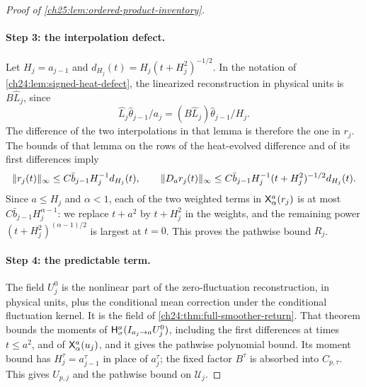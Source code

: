 \begin{proof}[Proof of \cref{ch25:lem:ordered-product-inventory}]
\paragraph{Step 3: the interpolation defect.}
Let $H_j=a_{j-1}$ and $d_{H_j}(t)=H_j(t+H_j^2)^{-1/2}$. In the notation of \cref{ch24:lem:signed-heat-defect}, the linearized reconstruction in physical units is $B\widehat L_j$, since
\[
 \widehat L_j\widehat\theta_{j-1}/a_j=(B\widehat L_j)\widehat\theta_{j-1}/H_j.
\]
The difference of the two interpolations in that lemma is therefore the one in $r_j$. The bounds of that lemma on the rows of the heat-evolved difference and of its first differences imply
\[
 \lVert r_j(t)\rVert_\infty\le C\bar b_{j-1}H_j^{-1}d_{H_j}(t),\qquad
 \lVert D_ar_j(t)\rVert_\infty\le C\bar b_{j-1}H_j^{-1}(t+H_j^2)^{-1/2}d_{H_j}(t).
\]
Since $a\le H_j$ and $\alpha<1$, each of the two weighted terms in $\mathsf X_{\alpha}^{a}(r_j)$ is at most $C\bar b_{j-1}H_j^{\alpha-1}$: we replace $t+a^2$ by $t+H_j^2$ in the weights, and the remaining power $(t+H_j^2)^{(\alpha-1)/2}$ is largest at $t=0$. This proves the pathwise bound $R_j$.

\paragraph{Step 4: the predictable term.}
The field $U_j^0$ is the nonlinear part of the zero-fluctuation reconstruction, in physical units, plus the conditional mean correction under the conditional fluctuation kernel. It is the field of \cref{ch24:thm:full-smoother-return}. That theorem bounds the moments of $\mathsf H_{\sigma}^{a}(I_{a_j\to a}U_j^0)$, including the first differences at times $t\le a^2$, and of $\mathsf X_{\alpha}^{a}(u_j)$, and it gives the pathwise polynomial bound. Its moment bound has $H_j^\tau=a_{j-1}^\tau$ in place of $a_j^\tau$; the fixed factor $B^\tau$ is absorbed into $C_{p,\tau}$. This gives $U_{p,j}$ and the pathwise bound on $\mathcal U_j$.


\end{proof}

